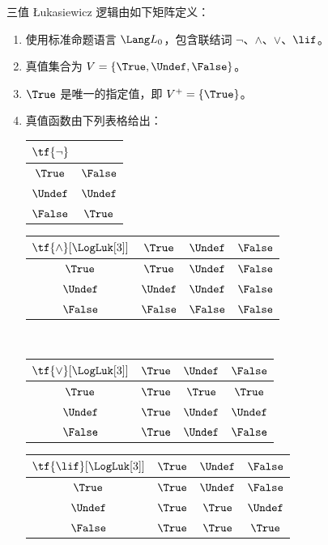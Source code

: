 \documentclass[../../../include/open-logic-section]{subfiles}
\begin{document}
\begin{defn}
三值 \L ukasiewicz 逻辑由如下矩阵定义：
\begin{enumerate}
  \item 使用标准命题语言 $\Lang L_0$，包含联结词 $\lnot$、$\land$、$\lor$、$\lif$。
  \item 真值集合为 $V = \{\True, \Undef, \False\}$。
  \item $\True$ 是唯一的指定值，即 $V^+ = \{\True\}$。
  \item 真值函数由下列表格给出：
  \begin{center}
    \begin{tabular}{c|c}
      $\tf{\lnot}$ & \\
      \hline
      $\True$ & $\False$ \\
      $\Undef$ & $\Undef$ \\
      $\False$ & $\True$
    \end{tabular}
    \quad
    \begin{tabular}{c|ccc}
      $\tf{\land}[\LogLuk[3]]$ & $\True$ & $\Undef$ & $\False$ \\
      \hline
      $\True$ & $\True$ & $\Undef$ & $\False$ \\
      $\Undef$ & $\Undef$ & $\Undef$ & $\False$\\
      $\False$ & $\False$ & $\False$ & $\False$
    \end{tabular}
    \\[2ex]
    \begin{tabular}{c|ccc}
      $\tf{\lor}[\LogLuk[3]]$ & $\True$ & $\Undef$ & $\False$ \\
      \hline
      $\True$ & $\True$ & $\True$ & $\True$ \\
      $\Undef$ & $\True$ & $\Undef$ & $\Undef$ \\
      $\False$ & $\True$ & $\Undef$ & $\False$
    \end{tabular}
    \quad
    \begin{tabular}{c|ccc}
      $\tf{\lif}[\LogLuk[3]]$ & $\True$ & $\Undef$ & $\False$ \\
      \hline
      $\True$ & $\True$ & $\Undef$ & $\False$ \\
      $\Undef$ & $\True$ & $\True$ & $\Undef$  \\
      $\False$ & $\True$ & $\True$ & $\True$
    \end{tabular}
  \end{center}
\end{enumerate}
\end{defn}
\end{document}
